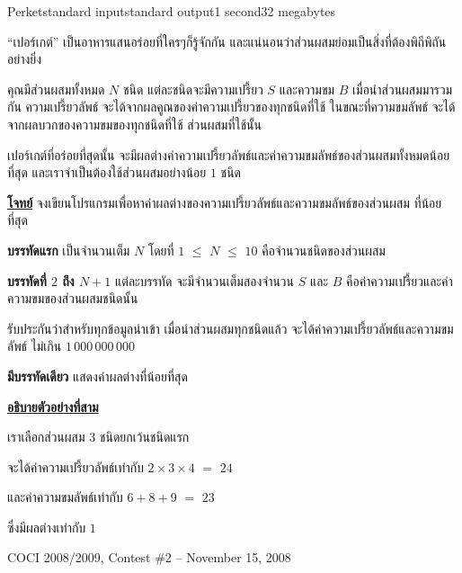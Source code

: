 \documentclass[11pt,a4paper]{article}
\begin{document}
\begin{problem}{Perket}{standard input}{standard output}{1 second}{32 megabytes}

“เปอร์เกต์” เป็นอาหารแสนอร่อยที่ใครๆก็รู้จักกัน และแน่นอนว่าส่วนผสมย่อมเป็นสิ่งที่ต้องพิถีพิถันอย่างยิ่ง

คุณมีส่วนผสมทั้งหมด $N$ ชนิด แต่ละชนิดจะมีความเปรี้ยว $S$ และความขม $B$ เมื่อนำส่วนผสมมารวมกัน ความเปรี้ยวลัพธ์ จะได้จากผลคูณของค่าความเปรี้ยวของทุกชนิดที่ใช้ ในขณะที่ความขมลัพธ์ จะได้จากผลบวกของความขมของทุกชนิดที่ใช้ ส่วนผสมที่ใช้นั้น

เปอร์เกต์ที่อร่อยที่สุดนั้น จะมีผลต่างค่าความเปรี้ยวลัพธ์และค่าความขมลัพธ์ของส่วนผสมทั้งหมดน้อยที่สุด และเราจำเป็นต้องใช้ส่วนผสมอย่างน้อย $1$ ชนิด

\underline{\textbf{โจทย์}} จงเขียนโปรแกรมเพื่อหาค่าผลต่างของความเปรี้ยวลัพธ์และความขมลัพธ์ของส่วนผสม ที่น้อยที่สุด

\InputFile

\textbf{บรรทัดแรก} เป็นจำนวนเต็ม $N$ โดยที่ $1$ $\leq$ $N$ $\leq$ $10$ คือจำนวนชนิดของส่วนผสม

\textbf{บรรทัดที่ $2$ ถึง $N+1$} แต่ละบรรทัด จะมีจำนวนเต็มสองจำนวน $S$ และ $B$ คือค่าความเปรี้ยวและค่าความขมของส่วนผสมชนิดนั้น

รับประกันว่าสำหรับทุกข้อมูลนำเข้า เมื่อนำส่วนผสมทุกชนิดแล้ว จะได้ค่าความเปรี้ยวลัพธ์และความขมลัพธ์ ไม่เกิน $1\,000\,000\,000$

\OutputFile

\textbf{มีบรรทัดเดียว} แสดงค่าผลต่างที่น้อยที่สุด

\Examples

\begin{example}
%
%
\end{example}
\begin{example}
%
\end{example}

\Note

\underline{\textbf{อธิบายตัวอย่างที่สาม}}

เราเลือกส่วนผสม $3$ ชนิดยกเว้นชนิดแรก

จะได้ค่าความเปรี้ยวลัพธ์เท่ากับ $2 \times 3 \times 4$  $=$ $24$

และค่าความขมลัพธ์เท่ากับ $6+8+9$ $=$ $23$

ซึ่งมีผลต่างเท่ากับ $1$

\Source

COCI 2008/2009, Contest \#2 – November 15, 2008



\end{problem}
\end{document}
